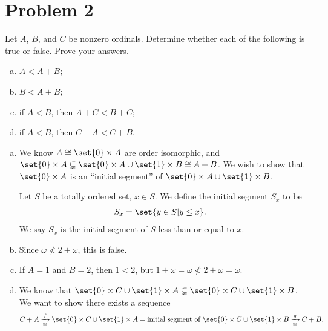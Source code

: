 \documentclass[10pt]{mypackage}
\begin{document}
\section{Problem 2}%
\begin{problem}
  Let $A$, $B$, and $C$ be nonzero ordinals. Determine whether each of the following is true or false. Prove your answers.
  \begin{enumerate}[(a)]
    \item $A < A+B$;
    \item $B < A+B$;
    \item if $A < B$, then $A+C < B+C$;
    \item if $A < B$, then $C+A < C+B$.
  \end{enumerate}
\end{problem}
\begin{solution}\hfill
  \begin{enumerate}[(a)]
    \item We know $A\cong \set{0} \times A$ are order isomorphic, and $\set{0}\times A \subsetneq \set{0}\times A \cup \set{1}\times B\cong A+B$. We wish to show that $\set{0}\times A $ is an ``initial segment'' of $\set{0}\times A \cup \set{1}\times B$.
      \begin{definition}
        Let $S$ be a totally ordered set, $x\in S$. We define the initial segment $S_x$ to be
        \begin{align*}
          S_x &= \set{y\in S|y \leq x}.
        \end{align*}
        We say $S_x$ is the initial segment of $S$ less than or equal to $x$.
      \end{definition}
      
    \item Since $\omega \not< 2 + \omega$, this is false.
    \item If $A = 1$ and $B = 2$, then $1 < 2$, but $1 + \omega = \omega \not< 2 + \omega = \omega$.
    \item We know that $\set{0}\times C \cup \set{1}\times A \subsetneq \set{0}\times C \cup \set{1}\times B$. We want to show there exists a sequence
      \begin{align*}
        C+A\xrightarrow[\cong]{f} \set{0}\times C \cup \set{1}\times A = \text{initial segment of }\set{0}\times C \cup \set{1}\times B \xrightarrow[\cong]{g} C+B.
      \end{align*}

  \end{enumerate}
\end{solution}
\end{document}
